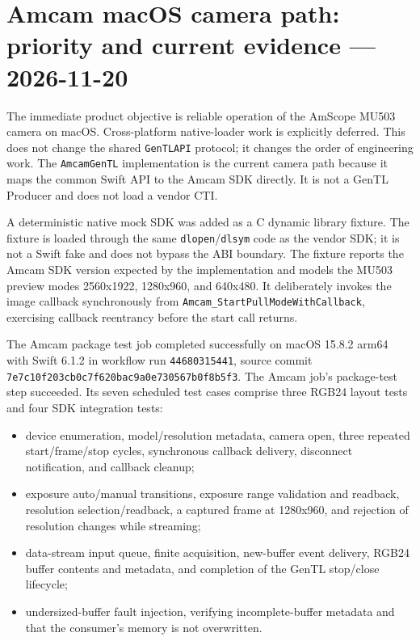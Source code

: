 \documentclass[11pt,a4paper]{report}
\begin{document}
\section{Amcam macOS camera path: priority and current evidence --- 2026-11-20}

The immediate product objective is reliable operation of the AmScope MU503 camera on macOS. Cross-platform native-loader work is explicitly deferred. This does not change the shared \texttt{GenTLAPI} protocol; it changes the order of engineering work. The \texttt{AmcamGenTL} implementation is the current camera path because it maps the common Swift API to the Amcam SDK directly. It is not a GenTL Producer and does not load a vendor CTI.

A deterministic native mock SDK was added as a C dynamic library fixture. The fixture is loaded through the same \texttt{dlopen}/\texttt{dlsym} code as the vendor SDK; it is not a Swift fake and does not bypass the ABI boundary. The fixture reports the Amcam SDK version expected by the implementation and models the MU503 preview modes 2560x1922, 1280x960, and 640x480. It deliberately invokes the image callback synchronously from \texttt{Amcam\_StartPullModeWithCallback}, exercising callback reentrancy before the start call returns.

The Amcam package test job completed successfully on macOS 15.8.2 arm64 with Swift 6.1.2 in workflow run \texttt{44680315441}, source commit \texttt{7e7c10f203cb0c7f620bac9a0e730567b0f8b5f3}. The Amcam job's package-test step succeeded. Its seven scheduled test cases comprise three RGB24 layout tests and four SDK integration tests:
\begin{itemize}
\item device enumeration, model/resolution metadata, camera open, three repeated start/frame/stop cycles, synchronous callback delivery, disconnect notification, and callback cleanup;
\item exposure auto/manual transitions, exposure range validation and readback, resolution selection/readback, a captured frame at 1280x960, and rejection of resolution changes while streaming;
\item data-stream input queue, finite acquisition, new-buffer event delivery, RGB24 buffer contents and metadata, and completion of the GenTL stop/close lifecycle;
\item undersized-buffer fault injection, verifying incomplete-buffer metadata and that the consumer's memory is not overwritten.
\end{itemize}
\end{document}

